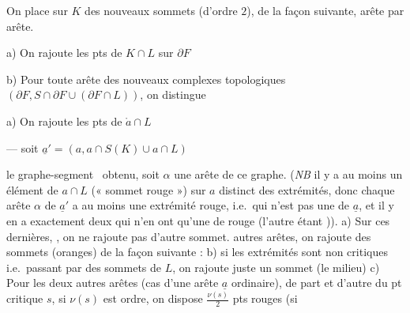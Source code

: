 \documentclass[11pt,a4paper]{article}
\begin{document}

On place sur $K$ des nouveaux sommets (d'ordre $2$), de la façon suivante,  arête par arête. \ill{}

a) On rajoute les pts de $K \cap L$ sur $\partial F$

b) Pour toute arête des nouveaux complexes topologiques \struck{\ill{}} $(\partial F, S \cap \partial F \cup (\partial F \cap L))$, \struck{\ill{}} on distingue

\quad a) On rajoute les pts de $\mathring{a} \cap L$

\quad --- soit $\underline{a}' = (a, a \cap S(K) \cup a \cap L)$

le graphe-segment \ obtenu, soit $\alpha$ une arête de ce graphe. (\emph{NB} \struck{\ill{}} il y a au moins un \struck{\ill{} \ill{} \ill{}} élément de $a \cap L$ (« \struck{\ill{}} sommet rouge ») sur $a$ distinct des extrémités, donc chaque arête $\alpha$ de $\underline{a}'$ \struck{\ill{}} a au moins une extrémité rouge, i.e.\ qui n'est pas une   de $\underline{a}$, et il y en a exactement deux qui n'en ont qu'une de rouge (l'autre étant )). a) Sur ces dernières, , on ne rajoute pas d'autre sommet.   autres arêtes, on \struck{\ill{}} rajoute des sommets (oranges) de la façon suivante : b) si \struck{\ill{}} les  extrémités sont non critiques i.e.\ passant par des sommets de $L$, on rajoute juste un sommet (le milieu) c)  Pour les deux autres arêtes (cas d'une arête $\underline{a}$ ordinaire), de part et d'autre du pt critique $s$, si $\nu(s)$ est  ordre, on dispose $\frac{\nu(s)}{2}$ pts rouges (si
\end{document}
